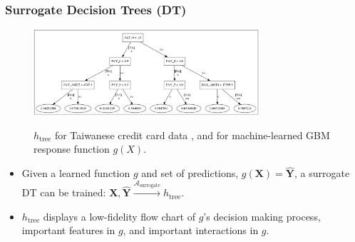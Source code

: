 \documentclass[11pt, 
               aspectratio=169
               ]{beamer}
\begin{document}
		\begin{frame}
		
			\frametitle{Surrogate Decision Trees (DT)}
			
			\begin{figure}[htb]
				\begin{center}
					\includegraphics[height=90pt]{img/dt_surrogate.png}
					\label{fig:dt_surrogate}
					\caption{$h_{\text{tree}}$ for Taiwanese credit card data \cite{uci}, and for machine-learned GBM response function $g(X)$.}
				\end{center}
			\end{figure}
			
			\vspace{-20 pt}
			
			\begin{itemize}
				
				\item Given a learned function $g$ and set of predictions, $g(\mathbf{X}) = \hat{\mathbf{Y}}$, a surrogate DT can be trained: $ \mathbf{X},\hat{\mathbf{Y}} \xrightarrow{\mathcal{A}_{\text{surrogate}}} h_{\text{tree}}$.
		
				\item $h_{\text{tree}}$ displays a low-fidelity flow chart of $g$'s decision making process, important features in $g$, and important interactions in $g$.	
			
			\end{itemize}
			
		\end{frame}
	
\end{document}
